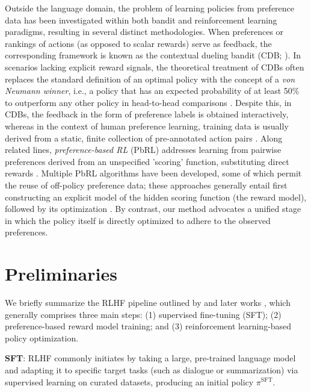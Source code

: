 Outside the language domain, the problem of learning policies from preference data has been investigated within both bandit and reinforcement learning paradigms, resulting in several distinct methodologies. When preferences or rankings of actions (as opposed to scalar rewards) serve as feedback, the corresponding framework is known as the contextual dueling bandit (CDB; \cite{yue2012karmed,dudik2015contextual}). In scenarios lacking explicit reward signals, the theoretical treatment of CDBs often replaces the standard definition of an optimal policy with the concept of a \textit{von Neumann winner}, i.e., a policy that has an expected probability of at least 50\% to outperform any other policy in head-to-head comparisons \citep{dudik2015contextual}. Despite this, in CDBs, the feedback in the form of preference labels is obtained interactively, whereas in the context of human preference learning, training data is usually derived from a static, finite collection of pre-annotated action pairs \citep{yan2022human}. Along related lines, \textit{preference-based RL} (PbRL) addresses learning from pairwise preferences derived from an unspecified 'scoring' function, substituting direct rewards \citep{BusaFekete2014,ruiz2023dueling}. Multiple PbRL algorithms have been developed, some of which permit the reuse of off-policy preference data; these approaches generally entail first constructing an explicit model of the hidden scoring function (the reward model), followed by its optimization \citep{jain2013learning,BusaFekete2014,christiano2017deep,sadigh2017active,kupcsik2018learning}. By contrast, our method advocates a unified stage in which the policy itself is directly optimized to adhere to the observed preferences.

\section{Preliminaries}\label{section:prelims}

We briefly summarize the RLHF pipeline outlined by \citeauthor{ziegler2020finetuning} and later works \citep{stiennon2022learning, bai2022training, ouyang2022training}, which generally comprises three main steps: (1) supervised fine-tuning (SFT); (2) preference-based reward model training; and (3) reinforcement learning-based policy optimization.

\textbf{SFT}: RLHF commonly initiates by taking a large, pre-trained language model and adapting it to specific target tasks (such as dialogue or summarization) via supervised learning on curated datasets, producing an initial policy $\pi^\text{SFT}$.

